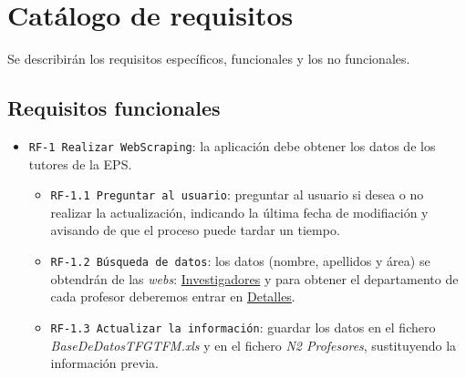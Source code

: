 \section{Catálogo de requisitos}
Se describirán los requisitos específicos, funcionales y los no funcionales.
\subsection{Requisitos funcionales}
\begin{itemize}
		\item \texttt{RF-1 Realizar WebScraping}: la aplicación debe obtener los datos de los tutores de la EPS.
		\begin{itemize}
				\item \texttt{RF-1.1 Preguntar al usuario}: preguntar al usuario si desea o no realizar la actualización, indicando la última fecha de modifiación y avisando de que el proceso puede tardar un tiempo.
				\item \texttt{RF-1.2 Búsqueda de datos}: los datos (nombre, apellidos y área) se obtendrán de las \emph{webs}: \href{https://investigacion.ubu.es/unidades/2682/investigadores}{Investigadores} y para obtener el departamento de cada profesor deberemos entrar en \href{https://investigacion.ubu.es/investigadores/34937/detalle}{Detalles}.
				\item \texttt{RF-1.3 Actualizar la información}: guardar los datos en el fichero \emph{BaseDeDatosTFGTFM.xls} y en el fichero \emph{N2 Profesores}, sustituyendo la información previa.
				

\end{itemize}
\end{itemize}
